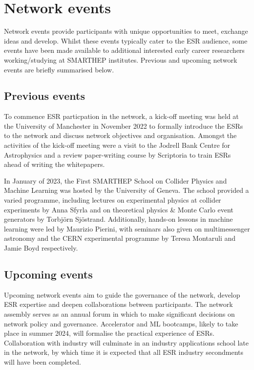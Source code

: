 \section{Network events}
\label{events}
Network events provide participants with unique opportunities to meet, exchange ideas and develop. Whilst these events typically cater to the ESR audience, some events have been made available to additional interested early career researchers working/studying at SMARTHEP institutes. Previous and upcoming network events are briefly summarised below.

\subsection{Previous events}
\label{previous-events}
To commence ESR particpation in the network, a kick-off meeting was held at the University of Manchester in November 2022 to formally introduce the ESRs to the network and discuss network objectives and organisation. Amongst the activities of the kick-off meeting were a visit to the Jodrell Bank Centre for Astrophysics and a review paper-writing course by Scriptoria to train ESRs ahead of writing the whitepapers.\par 

In January of 2023, the First SMARTHEP School on Collider Physics and Machine Learning was hosted by the University of Geneva. The school provided a varied programme, including lectures on experimental physics at collider experiments by Anna Sfyrla and on theoretical physics \& Monte Carlo event generators by Torbj\"orn Sj\"ostrand. Additionally, hands-on lessons in machine learning were led by Maurizio Pierini, with seminars also given on multimessenger astronomy and the CERN experimental programme by Teresa Montaruli and Jamie Boyd respectively.

\subsection{Upcoming events}
\label{upcoming-events}
Upcoming network events aim to guide the governance of the network, develop ESR expertise and deepen collaborations between participants. The network assembly serves as an annual forum in which to make significant decisions on network policy and governance. Accelerator and ML bootcamps, likely to take place in summer 2024, will formalise the practical experience of ESRs. Collaboration with industry will culminate in an industry applications school late in the network, by which time it is expected that all ESR industry secondments will have been completed.

